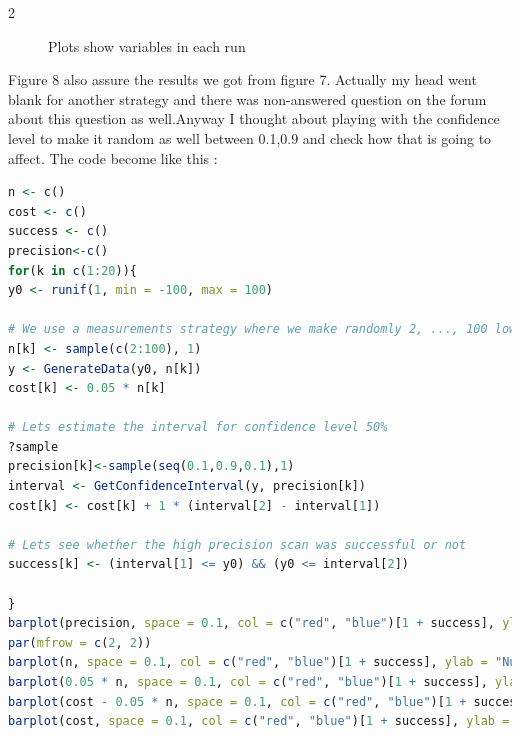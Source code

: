 \documentclass{article}
\begin{document}
\begin{multicols*}{2}
\begin{flushleft}
\begin{flushleft}
\begin{figure}[H]
\begin{center}
	\end{center}
	\caption{Plots show variables in each run}
\end{figure}
Figure 8 also assure the results we got from figure 7.
Actually my head went blank for another strategy and there was non-answered question on the forum about this question as well.Anyway  I thought about playing with the confidence level to make it random as well between 0.1,0.9 and check how that is going to affect.
The code become like this :
\begin{lstlisting}[language=R]
n <- c()
cost <- c()
success <- c()
precision<-c()
for(k in c(1:20)){
y0 <- runif(1, min = -100, max = 100)

# We use a measurements strategy where we make randomly 2, ..., 100 low precision measurements 
n[k] <- sample(c(2:100), 1)
y <- GenerateData(y0, n[k])
cost[k] <- 0.05 * n[k]

# Lets estimate the interval for confidence level 50%
?sample
precision[k]<-sample(seq(0.1,0.9,0.1),1)
interval <- GetConfidenceInterval(y, precision[k])
cost[k] <- cost[k] + 1 * (interval[2] - interval[1])

# Lets see whether the high precision scan was successful or not
success[k] <- (interval[1] <= y0) && (y0 <= interval[2]) 

}
barplot(precision, space = 0.1, col = c("red", "blue")[1 + success], ylab = "Confidience Level", ylim=c(0, 1),  xlab = "Run")
par(mfrow = c(2, 2))
barplot(n, space = 0.1, col = c("red", "blue")[1 + success], ylab = "Number of measurements", ylim=c(0, 100),  xlab = "Run")
barplot(0.05 * n, space = 0.1, col = c("red", "blue")[1 + success], ylab = "Cost of low-quality measurements", ylim=c(0, 5),  xlab = "Run")
barplot(cost - 0.05 * n, space = 0.1, col = c("red", "blue")[1 + success], ylab = "Cost of high-quality scan", xlab = "Run")
barplot(cost, space = 0.1, col = c("red", "blue")[1 + success], ylab = "Overall cost", ylim = c(0,10), xlab = "Run")


\end{lstlisting}
\end{flushleft}
\end{flushleft}
\end{multicols*}
\end{document}
